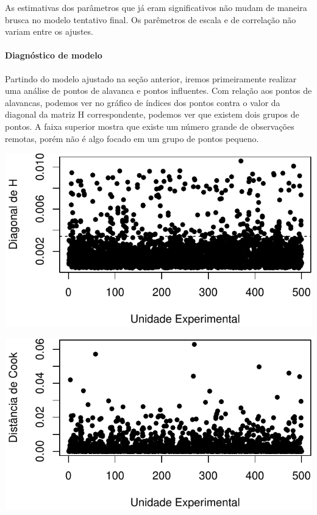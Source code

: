 \documentclass[
  11pt,
]{article}
\begin{document}
As estimativas dos parâmetros que já eram significativos não mudam de maneira brusca no modelo tentativo final. Os parêmetros de escala e de correlação não variam entre os ajustes.

\hypertarget{diagnuxf3stico-de-modelo}{%
\paragraph{Diagnóstico de modelo}\label{diagnuxf3stico-de-modelo}}

Partindo do modelo ajustado na seção anterior, iremos primeiramente realizar uma análise de pontos de alavanca e pontos influentes. Com relação aos pontos de alavancas, podemos ver no gráfico de índices dos pontos contra o valor da diagonal da matriz H correspondente, podemos ver que existem dois grupos de pontos. A faixa superior mostra que existe um número grande de observações remotas, porém não é algo focado em um grupo de pontos pequeno.

\begin{center}\includegraphics{lista3_files/figure-latex/unnamed-chunk-6-1} \end{center}

\begin{center}\includegraphics{lista3_files/figure-latex/unnamed-chunk-6-2} \end{center}
\end{document}
